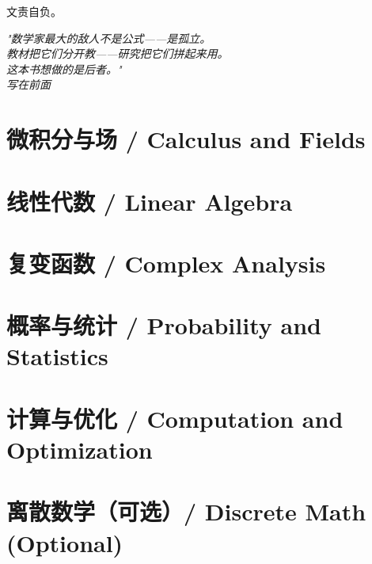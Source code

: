 \documentclass[11pt,a4paper,openany]{book}
\theoremstyle{definition}
\theoremstyle{remark}
\begin{document}
文责自负。

\clearpage
\thispagestyle{empty}
\vspace*{4cm}
\begin{center}
\itshape
\itshape
"数学家最大的敌人不是公式——是孤立。\\[6pt]
教材把它们分开教——研究把它们拼起来用。\\[6pt]
这本书想做的是后者。"\\[20pt]
\normalfont 写在前面
\end{center}

\clearpage
\tableofcontents

\mainmatter





\part{微积分与场 / Calculus and Fields}






\part{线性代数 / Linear Algebra}




\part{复变函数 / Complex Analysis}


\part{概率与统计 / Probability and Statistics}



\part{计算与优化 / Computation and Optimization}



\part{离散数学（可选）/ Discrete Math (Optional)}


\appendix


\end{document}
